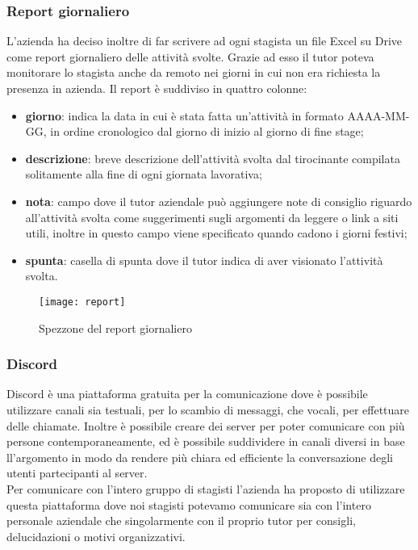 \subsubsection{Report giornaliero}
L'azienda ha deciso inoltre di far scrivere ad ogni stagista un file Excel su Drive come report giornaliero delle attività svolte. Grazie ad esso il tutor poteva monitorare lo stagista anche da remoto nei giorni in cui non era richiesta la presenza in azienda. Il report è suddiviso in quattro colonne:
\begin{itemize}
	\item \textbf{giorno}: indica la data in cui è stata fatta un'attività in formato AAAA-MM-GG, in ordine cronologico dal giorno di inizio al giorno di fine stage;
	\item \textbf{descrizione}: breve descrizione dell'attività svolta dal tirocinante compilata solitamente alla fine di ogni giornata lavorativa;
	\item \textbf{nota}: campo dove il tutor aziendale può aggiungere note di consiglio riguardo all'attività svolta come suggerimenti sugli argomenti da leggere o link a siti utili, inoltre in questo campo viene specificato quando cadono i giorni festivi;
	\item \textbf{spunta}: casella di spunta dove il tutor indica di aver visionato l'attività svolta.
\end{itemize}

\begin{figure}[H]
	\begin{center}
		\texttt{[image: report]}
		\caption{Spezzone del report giornaliero}
	\end{center}
\end{figure}


\subsubsection{Discord}
Discord è una piattaforma gratuita per la comunicazione dove è possibile utilizzare canali sia testuali, per lo scambio di messaggi, che vocali, per effettuare delle chiamate. Inoltre è possibile creare dei server per poter comunicare con più persone contemporaneamente, ed è possibile suddividere in canali diversi in base ll'argomento in modo da rendere più chiara ed efficiente la conversazione degli utenti partecipanti al server.\\
Per comunicare con l'intero gruppo di stagisti l'azienda ha proposto di utilizzare questa piattaforma dove noi stagisti potevamo comunicare sia con l'intero personale aziendale che singolarmente con il proprio tutor per consigli, delucidazioni o motivi organizzativi.

